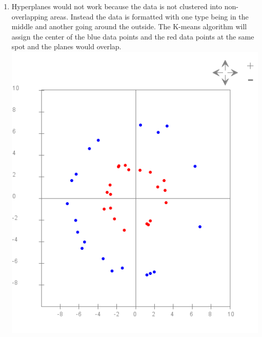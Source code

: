 \documentclass{article}
\begin{document}
\begin{enumerate}
\item Hyperplanes would not work because the data is not clustered into non-overlapping areas. Instead the data is formatted with one type being in the middle and another going around the outside. The K-means algorithm will assign the center of the blue data points and the red data points at the same spot and the planes would overlap. \\
\includegraphics[scale=0.45]{exercise25}


\end{enumerate}
\end{document}
